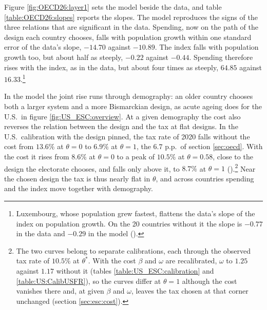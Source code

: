 Figure \ref{fig:OECD26:layer1} sets the model beside the data, and table \ref{table:OECD26:slopes} reports the slopes. The model reproduces the signs of the three relations that are significant in the data. Spending, now on the path of the design each country chooses, falls with population growth within one standard error of the data's slope, $-14.70$ against $-10.89$. The index falls with population growth too, but about half as steeply, $-0.22$ against $-0.44$. Spending therefore rises with the index, as in the data, but about four times as steeply, $64.85$ against $16.33$.\footnote{Luxembourg, whose population grew fastest, flattens the data's slope of the index on population growth. On the 20 countries without it the slope is $-0.77$ in the data and $-0.29$ in the model ().}



In the model the joint rise runs through demography: an older country chooses both a larger system and a more Bismarckian design, as acute ageing does for the U.S.\ in figure \ref{fig:US_ESC:overview}. At a given demography the cost also reverses the relation between the design and the tax at flat designs. In the U.S.\ calibration with the design pinned, the tax rate of 2020 falls without the cost from $13.6\%$ at $\theta = 0$ to $6.9\%$ at $\theta = 1$, the $6.7$ p.p.\ of section \ref{sec:oecd}. With the cost it rises from $8.6\%$ at $\theta = 0$ to a peak of $10.5\%$ at $\theta = 0.58$, close to the design the electorate chooses, and falls only above it, to $8.7\%$ at $\theta = 1$ ().\footnote{The two curves belong to separate calibrations, each through the observed tax rate of $10.5\%$ at $\theta^{\ast}$. With the cost $\beta$ and $\omega$ are recalibrated, $\omega$ to $1.25$ against $1.17$ without it (tables \ref{table:US_ESC:calibration} and \ref{table:US:CalibUSFR}), so the curves differ at $\theta = 1$ although the cost vanishes there and, at given $\beta$ and $\omega$, leaves the tax chosen at that corner unchanged (section \ref{sec:esc:cost}).} Near the chosen design the tax is thus nearly flat in $\theta$, and across countries spending and the index move together with demography.

